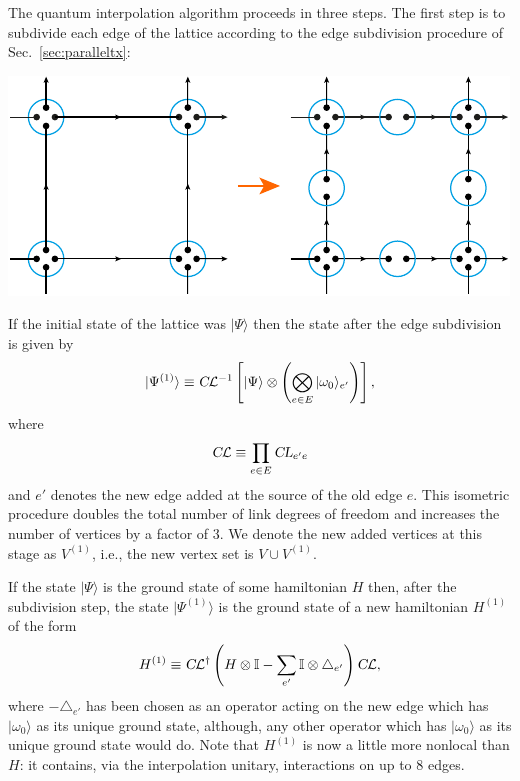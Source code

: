 \documentclass[twocolumn,lengthcheck,superscriptaddress]{revtex4-1}
\theoremstyle{definition}
\theoremstyle{remark}
\begin{document}
The quantum interpolation algorithm proceeds in three steps. The first step is to subdivide each edge of the lattice according to the edge subdivision procedure of Sec.~\ref{sec:paralleltx}:
\begin{center}
	\includegraphics{qinterp1.pdf}
\end{center} 
If the initial state of the lattice was $|\Psi\rangle$ then the state after the edge subdivision is given by
\begin{equation}
	|\Psi^{(1)}\rangle \equiv \textsl{C}\mathcal{L}^{-1}\left[|\Psi\rangle\otimes \left(\bigotimes_{e\in E}|\omega_0\rangle_{e'}\right)\right],
\end{equation}
where 
\begin{equation}
	\textsl{C}\mathcal{L} \equiv \prod_{e\in E} \textsl{CL}_{e'e}
\end{equation}
and $e'$ denotes the new edge added at the source of the old edge $e$. This isometric procedure doubles the total number of link degrees of freedom and increases the number of vertices by a factor of $3$. We denote the new added vertices at this stage as $V^{(1)}$, i.e., the new vertex set is $V\cup V^{(1)}$.

If the state $|\Psi\rangle$ is the ground state of some hamiltonian $H$ then, after the subdivision step, the state $|\Psi^{(1)}\rangle$ is the ground state of a new hamiltonian $H^{(1)}$ of the form
\begin{equation}\label{eq:parent1}
	H^{(1)} \equiv \textsl{C}\mathcal{L}^\dag \left(H\otimes \mathbb{I} - \sum_{e'} \mathbb{I}\otimes \triangle_{e'}\right) \textsl{C}\mathcal{L},
\end{equation} 
where $-\triangle_{e'}$ has been chosen as an operator acting on the new edge which has $|\omega_0\rangle$ as its unique ground state, although, any other operator which has $|\omega_0\rangle$ as its unique ground state would do. Note that $H^{(1)}$ is now a little more nonlocal than $H$: it contains, via the interpolation unitary, interactions on up to $8$ edges.
\end{document}
